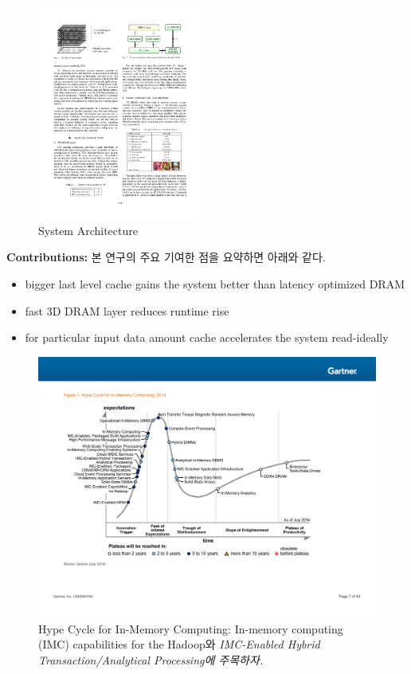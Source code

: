 \documentclass[twocolumn]{article}
\newcommand{\bi}{\begin{itemize}}
\newcommand{\ei}{\end{itemize}}
\newcommand{\ii}{\item}
\begin{document}
\begin{figure}[htb]
        \centering
        \includegraphics[width=0.48\textwidth]{cache-arch.pdf}
        \caption{System Architecture}
        \label{fig:sysarch}
\end{figure}

\noindent
\textbf{Contributions:} 본 연구의 주요 기여한 점을 요약하면 아래와 같다.
\bi  
\ii bigger last level cache gains the system better than latency optimized DRAM
\ii fast 3D DRAM layer reduces runtime rise
\ii for particular input data amount cache accelerates the system read-ideally
\ei

\begin{figure}[bth]
        \centering
        \includegraphics[width=1.0\textwidth]{in-memory.pdf}
        \caption{Hype Cycle for In-Memory Computing: In-memory computing (IMC) capabilities for the Hadoop와 \textit{IMC-Enabled Hybrid Transaction/Analytical Processing에 주목하자.}}
        \label{fig:in-memory}
\end{figure}
\end{document}
